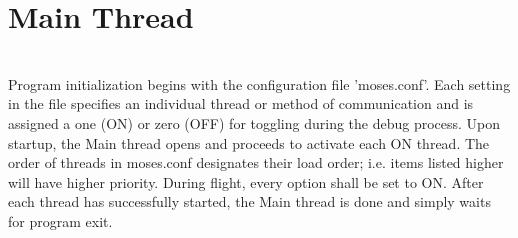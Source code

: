 %
\section{Main Thread}
\hrulefill
\\
Program initialization begins with the configuration file 'moses.conf'. Each setting in the file specifies an individual thread or method of communication and is assigned a one (ON) or zero (OFF) for toggling during the debug process. Upon startup, the Main thread opens and proceeds to activate each ON thread. The order of threads in moses.conf designates their load order; i.e. items listed higher will have higher priority. During flight, every option shall be set to ON. After each thread has successfully started, the Main thread is done and simply waits for program exit. 